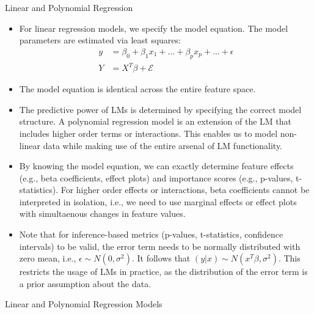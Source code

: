 \documentclass[11pt,compress,t,notes=noshow, xcolor=table]{beamer}
\begin{document}
\begin{vbframe}{Linear and Polynomial Regression}

\begin{itemize}
\setlength\itemsep{2em}
\item For linear regression models, we specify the model equation. The model parameters are estimated via least squares:
\begin{align*}
y &= \beta_0 + \beta_1 x_1 + \dots + \beta_p x_p + \dots + \epsilon \\
Y &= X^T\beta + \mathcal{E}
\end{align*}
\item The model equation is identical across the entire feature space.
\item The predictive power of LMs is determined by specifying the correct model structure. A polynomial regression model is an extension of the LM that includes higher order terms or interactions. This enables us to model non-linear data while making use of the entire arsenal of LM functionality.
\item
By knowing the model equation, we can exactly determine feature effects (e.g., beta coefficients, effect plots) and importance scores (e.g., p-values, t-statistics). For higher order effects or interactions, beta coefficients cannot be interpreted in isolation, i.e., we need to use marginal effects or effect plots with simultaenous changes in feature values.
\item Note that for inference-based metrics (p-values, t-statistics, confidence intervals) to be valid, the error term needs to be normally distributed with zero mean, i.e., $\epsilon \sim N(0, \sigma^2)$. It follows that $(y \vert x) \sim N(x^T \beta, \sigma^2)$. This restricts the usage of LMs in practice, as the distribution of the error term is a prior assumption about the data.
\end{itemize}
\end{vbframe}

\begin{vbframe}{Linear and Polynomial Regression Models}
\tiny

\end{vbframe}
\end{document}
